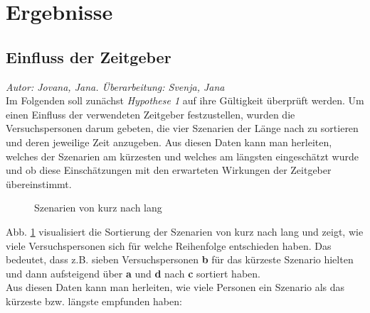 \documentclass{Paper}
\begin{document}
\section{Ergebnisse}
\subsection{Einfluss der Zeitgeber}
        \textit{Autor: Jovana, Jana. Überarbeitung: Svenja, Jana}\\
Im Folgenden soll zunächst \textit{Hypothese 1} auf ihre Gültigkeit überprüft werden. Um einen Einfluss der verwendeten Zeitgeber festzustellen, wurden die Versuchspersonen darum gebeten, die vier Szenarien der Länge nach zu sortieren und deren jeweilige Zeit anzugeben. Aus diesen Daten kann man herleiten, welches der Szenarien am kürzesten und welches am längsten eingeschätzt wurde und ob diese Einschätzungen mit den erwarteten Wirkungen der Zeitgeber übereinstimmt.

\begin{figure}[H]
  \caption{Szenarien von kurz nach lang}
  \label{SzenarienKurzLang}
  \end{figure}

Abb. \ref{SzenarienKurzLang} visualisiert die Sortierung der Szenarien von kurz nach lang und zeigt, wie viele Versuchspersonen sich für welche Reihenfolge entschieden haben. Das bedeutet, dass z.B. sieben Versuchspersonen \textbf{b} für das kürzeste Szenario hielten und dann aufsteigend über \textbf{a} und \textbf{d} nach  \textbf{c} sortiert haben. \\
Aus diesen Daten kann man herleiten, wie viele Personen ein Szenario als das kürzeste bzw. längste empfunden haben:
\end{document}
